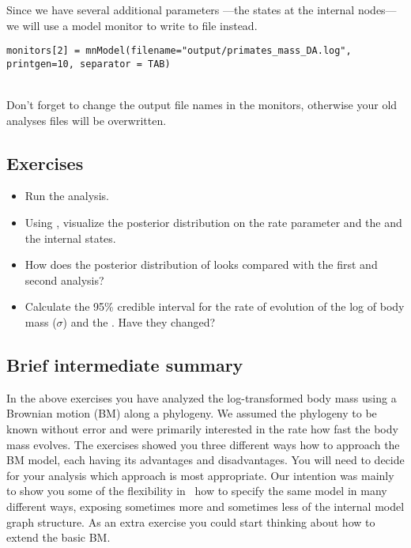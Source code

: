Since we have several additional parameters ---the states at the internal nodes--- we will use a model monitor to write to file instead.
{\tt \small \begin{snugshade*}
\begin{lstlisting}
monitors[2] = mnModel(filename="output/primates_mass_DA.log", printgen=10, separator = TAB)
\end{lstlisting}
\end{snugshade*}}


\noindent \\ \impmark Don't forget to change the output file names in the monitors, otherwise your old analyses files will be overwritten.


\subsection*{Exercises}

\begin{itemize}
\item
Run the analysis.
\item
Using , visualize the posterior distribution on the rate parameter  and the  and the internal states.
\item 
How does the posterior distribution of  looks compared with the first and second analysis?
\item
Calculate the 95\% credible interval for the rate of evolution of the log of body mass ($\sigma$) and the . Have they changed?
\end{itemize}

\vspace{5cm}



\subsection{Brief intermediate summary}
In the above exercises you have analyzed the log-transformed body mass using a Brownian motion (BM) along a phylogeny. We assumed the phylogeny to be known without error and were primarily interested in the rate how fast the body mass evolves. The exercises showed you three different ways how to approach the BM model, each having its advantages and disadvantages. You will need to decide for your analysis which approach is most appropriate. Our intention was mainly to show you some of the flexibility in \RevBayes~how to specify the same model in many different ways, exposing sometimes more and sometimes less of the internal model graph structure. As an extra exercise you could start thinking about how to extend the basic BM.



